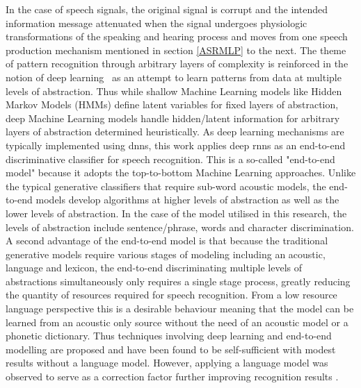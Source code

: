  In the case of speech signals, the original signal is corrupt and  the intended information message attenuated when the signal undergoes physiologic transformations of the speaking and hearing process and moves from one speech production mechanism mentioned in section \ref{ASRMLP} to the next.  The theme of pattern recognition through arbitrary layers of complexity is reinforced in the notion of deep learning~\cite{deng2014deep} as an attempt to learn patterns from data at multiple levels of abstraction. Thus while shallow Machine Learning models like Hidden Markov Models (HMMs) define latent variables for fixed layers of abstraction, deep Machine Learning models handle hidden/latent information for arbitrary layers of abstraction determined heuristically.  As deep learning mechanisms are typically implemented using \acrlong{dnn}s, this work applies deep \acrlong{rnn}s as an end-to-end discriminative classifier for speech recognition.  This is a so-called "end-to-end model" because it adopts the top-to-bottom Machine Learning approaches. Unlike the typical generative classifiers that require sub-word acoustic models, the end-to-end models develop algorithms at higher levels of abstraction as well as the lower levels of abstraction. In the case of the model utilised in this research, the levels of abstraction include sentence/phrase, words and character discrimination. A second advantage of the end-to-end model is that because the traditional generative models require various stages of modeling including an acoustic, language and lexicon, the end-to-end discriminating multiple levels of abstractions simultaneously only requires a single stage process, greatly reducing the quantity of resources required for speech recognition.  From a low resource language perspective this is a desirable behaviour meaning that the model can be learned from an acoustic only source without the need of an acoustic model or a phonetic dictionary.   Thus techniques involving deep learning and end-to-end modelling are proposed and have been found to be self-sufficient \citep{hannun2014deep} with modest results without a language model.  However, applying a language model was observed to serve as a correction factor further improving recognition results \citep{hannun2014deep}. 

